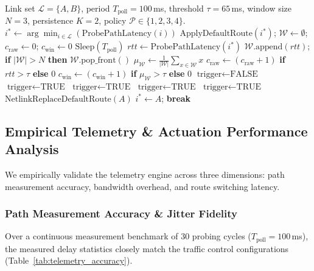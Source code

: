 \begin{algorithm}[htbp]
\caption{Phase 2 Dual-Path Telemetry and Flow Steering Engine}
\label{alg:phase2_steering}
\begin{algorithmic}[1]
\REQUIRE Link set $\mathcal{L} = \{A, B\}$, period $T_{\text{poll}} = 100$\,ms, threshold $\tau = 65$\,ms, window size $N = 3$, persistence $K = 2$, policy $\mathcal{P} \in \{1, 2, 3, 4\}$.
\STATE $i^* \leftarrow \arg\min_{i \in \mathcal{L}} (\text{ProbePathLatency}(i))$
\STATE $\text{ApplyDefaultRoute}(i^*)$; \quad $\mathcal{W} \leftarrow \emptyset$; \quad $c_{\text{raw}} \leftarrow 0$; \quad $c_{\text{win}} \leftarrow 0$
    \STATE $\text{Sleep}(T_{\text{poll}})$
    \STATE $rtt \leftarrow \text{ProbePathLatency}(i^*)$
    \STATE $\mathcal{W}.\text{append}(rtt)$; \quad \textbf{if} $|\mathcal{W}| > N$ \textbf{then} $\mathcal{W}.\text{pop\_front}()$
    \STATE $\mu_{\mathcal{W}} \leftarrow \frac{1}{|\mathcal{W}|}\sum_{x \in \mathcal{W}} x$
    \STATE $c_{\text{raw}} \leftarrow (c_{\text{raw}} + 1)$ \textbf{if} $rtt > \tau$ \textbf{else} $0$
    \STATE $c_{\text{win}} \leftarrow (c_{\text{win}} + 1)$ \textbf{if} $\mu_{\mathcal{W}} > \tau$ \textbf{else} $0$
    \STATE $\text{trigger} \leftarrow \text{FALSE}$
     \STATE $\text{trigger} \leftarrow \text{TRUE}$
     \STATE $\text{trigger} \leftarrow \text{TRUE}$
     \STATE $\text{trigger} \leftarrow \text{TRUE}$
     \STATE $\text{trigger} \leftarrow \text{TRUE}$
    \ENDIF
        \STATE $\text{NetlinkReplaceDefaultRoute}(A)$
        \STATE $i^* \leftarrow A$; \quad \textbf{break}
    \ENDIF
\ENDWHILE
\end{algorithmic}
\end{algorithm}

\subsection{Empirical Telemetry \& Actuation Performance Analysis}
\label{subsec:empirical_telemetry_results}

We empirically validate the telemetry engine across three dimensions: path measurement accuracy, bandwidth overhead, and route switching latency.

\subsubsection{Path Measurement Accuracy \& Jitter Fidelity}
Over a continuous measurement benchmark of 30 probing cycles ($T_{\text{poll}} = 100$\,ms), the measured delay statistics closely match the traffic control configurations (Table~\ref{tab:telemetry_accuracy}).

